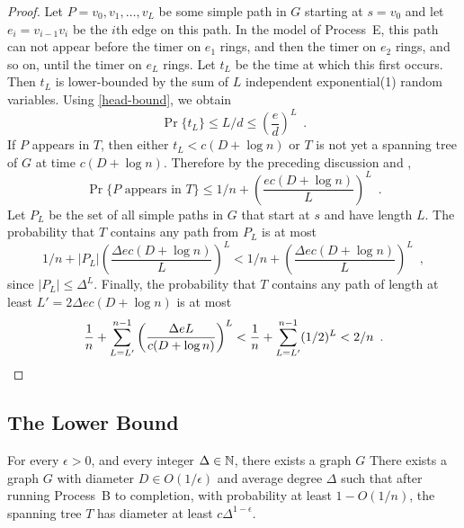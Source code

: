 \documentclass{patmorin}
\begin{document}
\begin{proof}
  Let $P=v_0,v_1,\ldots,v_L$ be some simple path in $G$ starting at
  $s=v_0$ and let $e_i=v_{i-1}v_i$ be the $i$th edge on this path.
  In the model of Process~E, this path can not appear before the timer
  on $e_1$ rings, and then the timer on $e_2$ rings, and so on, until the
  timer on $e_L$ rings.  Let $t_L$ be the time at which this first occurs.
  Then $t_L$ is lower-bounded by the sum of $L$ independent exponential(1)
  random variables.  Using \eqref{head-bound}, we obtain
  \[
      \Pr\{t_L\} \le L/d \le \left(\frac{e}{d}\right)^L \enspace .
  \]
  If $P$ appears in $T$, then either $t_L < c(D+\log n)$ or $T$ is not
  yet a spanning tree of $G$ at time $c(D+\log n)$.  
  Therefore by the preceding discussion and , 
  \[
      \Pr\{\text{$P$ appears in $T$}\} \le 1/n 
        + \left(\frac{ec(D+\log n)}{L}\right)^L \enspace .
  \]
  Let $P_L$ be the set of all simple paths in $G$ that start at $s$ and have length $L$.  The probability that $T$ contains any path from $P_L$ is at most
  \[
      1/n + |P_L|\left(\frac{\Delta ec(D+\log n)}{L}\right)^L 
      < 1/n + \left(\frac{\Delta ec(D+\log n)}{L}\right)^L \enspace ,
  \]
  since $|P_L|\le \Delta^L$.
  Finally, the probability that $T$ contains any path of length at least
  $L'=2\Delta ec(D+\log n)$ is at most
  \[
     \frac{1}{n}+\sum_{L=L'}^{n-1} \left(\frac{\Delta e L}{c(D+\log n)}\right)^L <  \frac{1}{n}+\sum_{L=L'}^{n-1} (1/2)^L < 2/n \enspace . \qedhere
  \]
\end{proof}

\subsection{The Lower Bound}

\begin{lem}
  For every $\epsilon >0$, and every integer $\Delta\in \mathbb{N}$, there
  exists a graph $G$ There exists a graph $G$ with diameter $D\in
  O(1/\epsilon)$ and average degree $\Delta$ such that after running
  Process~B to completion, with probability at least $1-O(1/n)$, the
  spanning tree $T$ has diameter at least $c\Delta^{1-\epsilon}$.
\end{lem}
\end{document}
